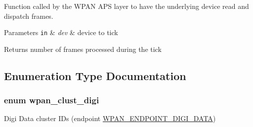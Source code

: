 Function called by the W\-P\-A\-N A\-P\-S layer to have the underlying device read and dispatch frames. 


\begin{DoxyParams}[1]{Parameters}
\mbox{\tt in}  & {\em dev} & device to tick\\
\hline
\end{DoxyParams}
\begin{DoxyReturn}{Returns}
number of frames processed during the tick 
\end{DoxyReturn}


\subsection{Enumeration Type Documentation}
\hypertarget{group__wpan__aps_ga1227ab13b41d82d9c9c9080662f74cf7}{
\subsubsection[{wpan\-\_\-clust\-\_\-digi}]{\setlength{\rightskip}{0pt plus 5cm}enum {\bf wpan\-\_\-clust\-\_\-digi}}}\label{group__wpan__aps_ga1227ab13b41d82d9c9c9080662f74cf7}


Digi Data cluster I\-Ds (endpoint \hyperlink{group__wpan__aps_ga83cb85a2a1e374554f9ad735c9c06e7b}{W\-P\-A\-N\-\_\-\-E\-N\-D\-P\-O\-I\-N\-T\-\_\-\-D\-I\-G\-I\-\_\-\-D\-A\-T\-A}) 

